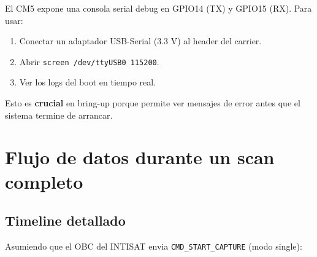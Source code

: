 \documentclass[11pt,a4paper,oneside,openright]{book}
\begin{document}
El CM5 expone una consola serial debug en GPIO14 (TX) y GPIO15 (RX).
Para usar:

\begin{enumerate}[leftmargin=2em]
  \item Conectar un adaptador USB-Serial (3.3 V) al header del carrier.
  \item Abrir \texttt{screen /dev/ttyUSB0 115200}.
  \item Ver los logs del boot en tiempo real.
\end{enumerate}

Esto es \textbf{crucial} en bring-up porque permite ver mensajes de error
antes que el sistema termine de arrancar.

\chapter{Flujo de datos durante un scan completo}
\label{ch:flujo}

\section{Timeline detallado}

Asumiendo que el OBC del INTISAT envia \texttt{CMD\_START\_CAPTURE} (modo
single):
\end{document}
